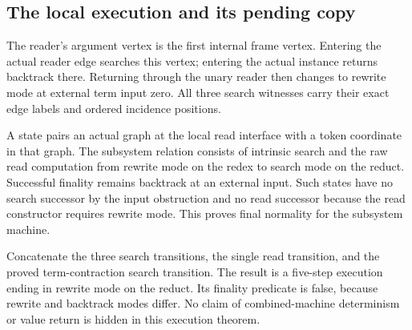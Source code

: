 




\subsection{The local execution and its pending copy}

The reader's argument vertex is the first internal frame vertex. Entering
the actual reader edge searches this vertex; entering the actual instance
returns backtrack there. Returning through the unary reader then changes to
rewrite mode at external term input zero. All three search witnesses carry
their exact edge labels and ordered incidence positions.





A state pairs an actual graph at the local read interface with a token
coordinate in that graph. The subsystem relation consists of intrinsic search
and the raw read computation from rewrite mode on the redex to search mode on
the reduct. Successful finality remains backtrack at an external input.
Such states have no search successor by the input obstruction and no read
successor because the read constructor requires rewrite mode. This proves
final normality for the subsystem machine.

Concatenate the three search transitions, the single read transition, and the
proved term-contraction search transition. The result is a five-step execution
ending in rewrite mode on the reduct. Its finality predicate is false, because
rewrite and backtrack modes differ. No claim of combined-machine determinism
or value return is hidden in this execution theorem.

